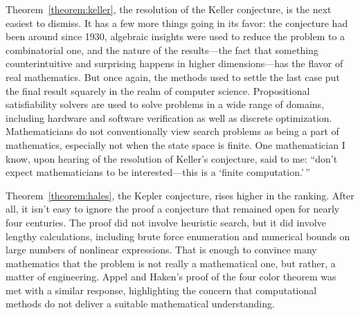\documentclass{amsart}
\theoremstyle{definition}
\theoremstyle{remark}
\numberwithin{equation}{section}
\begin{document}
Theorem~\ref{theorem:keller}, the resolution of the Keller conjecture, is the next easiest to dismiss. It has a few more things going in its favor: the conjecture had been around since 1930, algebraic insights were used to reduce the problem to a combinatorial one, and the nature of the results---the fact that something counterintuitive and surprising happens in higher dimensions---has the flavor of real mathematics. But once again, the methods used to settle the last case put the final result squarely in the realm of computer science. Propositional satisfiability solvers are used to solve problems in a wide range of domains, including hardware and software verification as well as discrete optimization. Mathematicians do not conventionally view search problems as being a part of mathematics, especially not when the state space is finite. One mathematician I know, upon hearing of the resolution of Keller's conjecture, said to me: ``don't expect mathematicians to be interested---this is a `finite computation.'\,''

Theorem~\ref{theorem:hales}, the Kepler conjecture, rises higher in the ranking. After all, it isn't easy to ignore the proof a conjecture that remained open for nearly four centuries. The proof did not involve heuristic search, but it did involve lengthy calculations, including brute force enumeration and numerical bounds on large numbers of nonlinear expressions. That is enough to convince many mathematics that the problem is not really a mathematical one, but rather, a matter of engineering. Appel and Haken's proof of the four color theorem was met with a similar response, highlighting the concern that computational methods do not deliver a suitable mathematical understanding.
\end{document}
